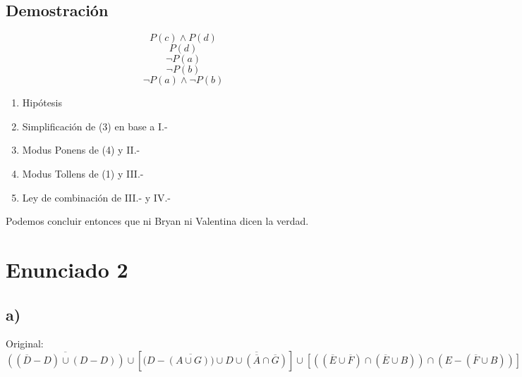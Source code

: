 \documentclass[letterpaper,10pt]{article}
\begin{document}
\subsection{Demostraci\'on}
\begin{minipage}[c]{0.4\textwidth}
\begin{equation*}
    P(c) \wedge  P(d)
\end{equation*}
\begin{equation*}
    P(d)
\end{equation*}
\begin{equation*}
    \neg P(a)
\end{equation*}
\begin{equation*}
    \neg P(b)
\end{equation*}
\begin{equation*}
    \neg P(a) \wedge \neg P(b)
\end{equation*}
\end{minipage}
\begin{minipage}[c]{0.5\textwidth}
\begin{enumerate}[I{.-}]
    \item Hip\'otesis
    \item Simplificaci\'on de (3) en base a I.-
    \item Modus Ponens de (4) y II.-
    \item Modus Tollens de (1) y III.-
    \item Ley de combinaci\'on de III.- y IV.-
\end{enumerate}
\end{minipage}
\vspace{0.4cm}
\newline
Podemos concluir entonces que ni Bryan ni Valentina dicen la verdad.


\section{Enunciado 2}

\subsection*{a)}
Original:
\begin{equation*}
    \overline{((\overline{D}-D)\cup(D-D))}\cup [(D-\overline{(A \cup G))} \cup \overline{D\cup(\overline{A}\cap \overline{G})}] \cup [((\overline{E}\cup \overline{F})\cap (\overline{E}\cup B)) \cap (E - (\overline{F}\cup B))]
\end{equation*}
\end{document}
